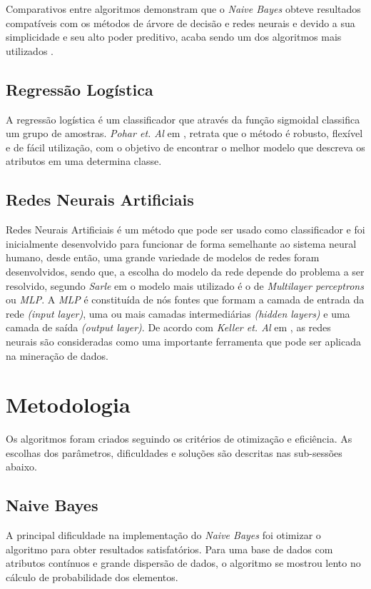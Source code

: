 \documentclass[10pt, conference, compsocconf]{IEEEtran}
\begin{document}
Comparativos entre algoritmos demonstram que o \textit{Naive Bayes} obteve resultados compatíveis com os métodos de árvore de decisão e redes neurais e devido a sua simplicidade e seu alto poder preditivo, acaba sendo um dos algoritmos mais utilizados \cite{5}.
 
\subsection{Regressão Logística}
A regressão logística é um classificador que através da função sigmoidal classifica um grupo de amostras. \textit{Pohar et. Al} em \cite{6}, retrata que o método é robusto, flexível e de fácil utilização, com o objetivo de encontrar o melhor modelo que descreva os atributos em uma determina classe.

\subsection{Redes Neurais Artificiais}
Redes Neurais Artificiais é um método que pode ser usado como classificador e foi inicialmente desenvolvido para funcionar de forma semelhante ao sistema neural humano, desde então, uma grande variedade de modelos de redes foram desenvolvidos, sendo que, a escolha do modelo da rede depende do problema a ser resolvido, segundo \textit{Sarle} em \cite{7} o modelo mais utilizado é o de \textit{Multilayer perceptrons} ou \textit{MLP}. A \textit{MLP} é constituída de nós fontes que formam a camada de entrada da rede \textit{(input layer)}, uma ou mais camadas intermediárias \textit{(hidden layers)} e uma camada de saída \textit{(output layer)}. De acordo com \textit{Keller et. Al} em \cite{11}, as redes neurais são consideradas como uma importante ferramenta que pode ser aplicada na mineração de dados. 

\section{Metodologia}\label{metodologia}
Os algoritmos foram criados seguindo os critérios de otimização e eficiência. As escolhas dos parâmetros, dificuldades e soluções são descritas nas sub-sessões abaixo.

\subsection{Naive Bayes}
A principal dificuldade na implementação do \textit{Naive Bayes} foi otimizar o algoritmo para obter resultados satisfatórios. Para uma base de dados com atributos contínuos e grande dispersão de dados, o algoritmo se mostrou lento no cálculo de probabilidade dos elementos. 
\end{document}
